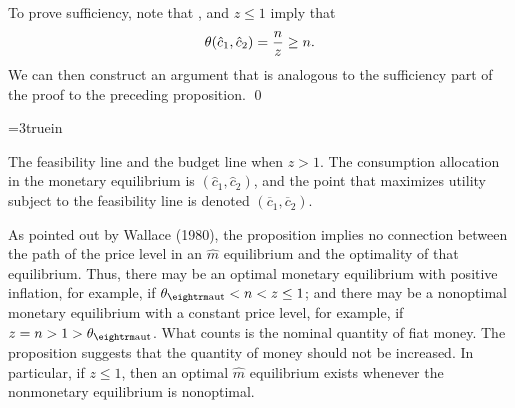To prove sufficiency, note that ,  and $z\leq 1$
imply that
$$
\theta(\hat c_1, \hat c_2) = { n \over z} \geq n.
$$
We can then construct an argument that is analogous to the sufficiency
part of the proof to the preceding proposition. \qed


\centerline{\epsfxsize=3truein}
\caption{The feasibility line  and the budget line 
when $z>1$.  The consumption allocation in the monetary equilibrium is
$(\hat c_1, \hat c_2)$, and the point that maximizes utility subject to
the feasibility line is denoted $(\overline c_1, \overline c_2)$.}
\endfigure

As pointed out by Wallace (1980), the proposition implies no connection
between the path of the price level in an $\hat m$ equilibrium and the
optimality of that equilibrium.  Thus, there may be an optimal monetary
equilibrium with positive inflation, for example, if
$\theta_{\rm aut} < n < z \leq 1$; and there may be a nonoptimal
monetary equilibrium with a constant price level,  for example,
if $z = n > 1 > \theta_{\rm aut}$.  What counts is the nominal
quantity of fiat money. The proposition suggests that the quantity
of money should not be increased. In particular, if $z \leq 1$,
then an optimal $\hat m$ equilibrium exists whenever the nonmonetary
equilibrium is nonoptimal.

 

